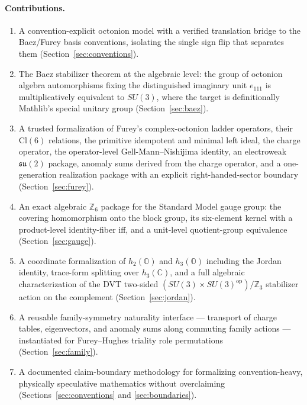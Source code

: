 \documentclass[11pt]{article}
\newcommand{\C}{\mathbb{C}}
\newcommand{\OO}{\mathbb{O}}
\newcommand{\su}{\mathfrak{su}}
\begin{document}
\paragraph{Contributions.}
\begin{enumerate}[leftmargin=2em]
\item A convention-explicit octonion model with a verified translation
  bridge to the Baez/Furey basis conventions, isolating the single sign
  flip that separates them (Section~\ref{sec:conventions}).
\item The Baez stabilizer theorem at the algebraic level: the group of
  octonion algebra automorphisms fixing the distinguished imaginary unit
  $e_{111}$ is multiplicatively equivalent to $SU(3)$, where the target
  is definitionally Mathlib's special unitary group
  (Section~\ref{sec:baez}).
\item A trusted formalization of Furey's complex-octonion ladder
  operators, their $\mathrm{Cl}(6)$ relations, the primitive idempotent
  and minimal left ideal, the charge operator, the operator-level
  Gell-Mann--Nishijima identity, an electroweak $\su(2)$ package, anomaly
  sums derived from the charge operator, and a one-generation realization
  package with an explicit right-handed-sector boundary
  (Section~\ref{sec:furey}).
\item An exact algebraic $\mathbb{Z}_6$ package for the Standard Model
  gauge group: the covering homomorphism onto the block group, its
  six-element kernel with a product-level identity-fiber iff, and a
  unit-level quotient-group equivalence (Section~\ref{sec:gauge}).
\item A coordinate formalization of $h_2(\OO)$ and $h_3(\OO)$ including
  the Jordan identity, trace-form splitting over $h_3(\C)$, and a full
  algebraic characterization of the DVT two-sided
  $(SU(3)\times SU(3)^{\mathrm{op}})/\mathbb{Z}_3$ stabilizer action on
  the complement (Section~\ref{sec:jordan}).
\item A reusable family-symmetry naturality interface --- transport of
  charge tables, eigenvectors, and anomaly sums along commuting family
  actions --- instantiated for Furey--Hughes triality role permutations
  (Section~\ref{sec:family}).
\item A documented claim-boundary methodology for formalizing
  convention-heavy, physically speculative mathematics without
  overclaiming (Sections~\ref{sec:conventions} and
  \ref{sec:boundaries}).
\end{enumerate}
\end{document}
